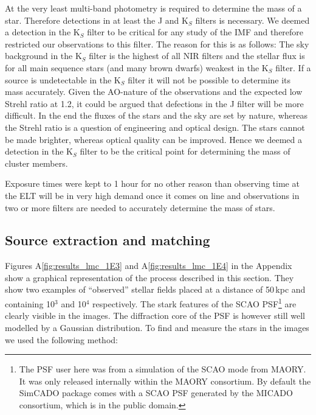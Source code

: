 At the very least multi-band photometry is required to determine the mass of a star. Therefore detections in at least the J and K$_S$ filters is necessary. We deemed a detection in the K$_S$ filter to be critical for any study of the IMF and therefore restricted our observations to this filter. The reason for this is as follows: The sky background in the K$_S$ filter is the highest of all NIR filters and the stellar flux is for all main sequence stars (and many brown dwarfs) weakest in the K$_S$ filter. If a source is undetectable in the K$_S$ filter it will not be possible to determine its mass accurately. Given the AO-nature of the observations and the expected low Strehl ratio at 1.2\um \citep{clenet2016}, it could be argued that defections in the J filter will be more difficult. In the end the fluxes of the stars and the sky are set by nature, whereas the Strehl ratio is a question of engineering and optical design. The stars cannot be made brighter, whereas optical quality can be improved. Hence we deemed a detection in the K$_S$ filter to be the critical point for determining the mass of cluster members.

Exposure times were kept to 1 hour for no other reason than observing time at the ELT will be in very high demand once it comes on line and observations in two or more filters are needed to accurately determine the mass of stars.


\subsection{Source extraction and matching}
Figures A\ref{fig:results_lmc_1E3} and A\ref{fig:results_lmc_1E4} in the Appendix show a graphical representation of the process described in this section. They show two examples of ``observed'' stellar fields placed at a distance of 50\,kpc and containing 10$^3$ and 10$^4$ \spa respectively. The stark features of the SCAO PSF\footnote{The PSF user here was from a simulation of the SCAO mode from MAORY. It was only released internally within the MAORY consortium. By default the SimCADO package comes with a SCAO PSF generated by the MICADO consortium, which is in the public domain.} are clearly visible in the images. The diffraction core of the PSF is however still well modelled by a Gaussian distribution. To find and measure the stars in the images we used the following method:

